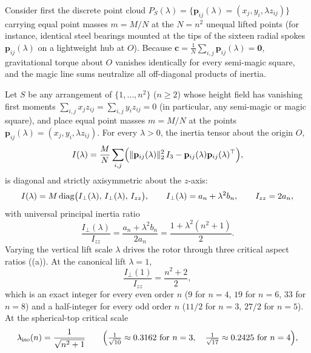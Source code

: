 Consider first the discrete point cloud $P_S(\lambda)=\{\mathbf p_{ij}(\lambda)=(x_j,y_i,\lambda z_{ij})\}$ carrying equal point masses $m=M/N$ at the $N=n^2$ unequal lifted points (for instance, identical steel bearings mounted at the tips of the sixteen radial spokes $\mathbf p_{ij}(\lambda)$ on a lightweight hub at $O$). Because $\mathbf c=\frac1N\sum_{i,j}\mathbf p_{ij}(\lambda)=\mathbf 0$, gravitational torque about $O$ vanishes identically for every semi-magic square, and the magic line sums neutralize all off-diagonal products of inertia.

\begin{theorem}
\label{thm:rotor}
Let $S$ be any arrangement of $\{1,\dots,n^2\}$ ($n\ge2$) whose height field has vanishing first moments $\sum_{i,j}x_jz_{ij}=\sum_{i,j}y_iz_{ij}=0$ (in particular, any semi-magic or magic square), and place equal point masses $m=M/N$ at the points $\mathbf p_{ij}(\lambda)=(x_j,y_i,\lambda z_{ij})$. For every $\lambda>0$, the inertia tensor about the origin $O$,
\[
I(\lambda) = \frac{M}{N}\sum_{i,j}\Bigl(\|\mathbf p_{ij}(\lambda)\|_2^2\,I_3 - \mathbf p_{ij}(\lambda)\mathbf p_{ij}(\lambda)^{\top}\Bigr),
\]
is diagonal and strictly axisymmetric about the $z$-axis:
\begin{equation}
\label{eq:inertia-point}
I(\lambda) = M\operatorname{diag}\bigl(I_\perp(\lambda),\, I_\perp(\lambda),\, I_{zz}\bigr),\qquad
I_\perp(\lambda) = a_n + \lambda^2 b_n,\qquad
I_{zz} = 2a_n,
\end{equation}
with universal principal inertia ratio
\begin{equation}
\label{eq:inertia-ratio}
\frac{I_\perp(\lambda)}{I_{zz}} = \frac{a_n + \lambda^2 b_n}{2a_n} = \frac{1 + \lambda^2(n^2+1)}{2}.
\end{equation}
Varying the vertical lift scale $\lambda$ drives the rotor through three critical aspect ratios ((a)). At the canonical lift $\lambda=1$,
\begin{equation}
\label{eq:ratio-lambda1}
\frac{I_\perp(1)}{I_{zz}} = \frac{n^2+2}{2},
\end{equation}
which is an exact integer for every even order $n$ ($9$ for $n=4$, $19$ for $n=6$, $33$ for $n=8$) and a half-integer for every odd order $n$ ($11/2$ for $n=3$, $27/2$ for $n=5$). At the spherical-top critical scale
\begin{equation}
\label{eq:lambda-iso}
\lambda_{\mathrm{iso}}(n) = \frac{1}{\sqrt{n^2+1}}
\qquad\Bigl(\tfrac{1}{\sqrt{10}}\approx0.3162\text{ for }n=3,\quad \tfrac{1}{\sqrt{17}}\approx0.2425\text{ for }n=4\Bigr),

\end{equation}
\end{theorem}
